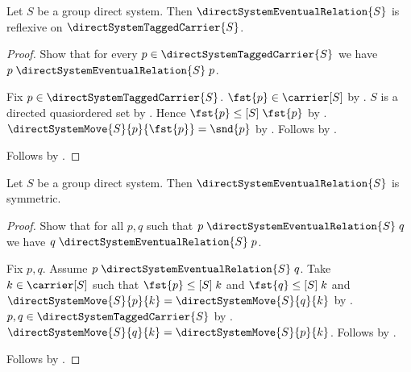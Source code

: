 \begin{proposition}\label{direct_system_eventual_reflexive}
    Let $S$ be a group direct system.
    Then $\directSystemEventualRelation{S}$ is reflexive on
        $\directSystemTaggedCarrier{S}$.
\end{proposition}
\begin{proof}
    Show that for every $p\in\directSystemTaggedCarrier{S}$ we have
        $p\mathrel{\directSystemEventualRelation{S}}p$.
    \begin{subproof}
        Fix $p\in\directSystemTaggedCarrier{S}$.
        $\fst{p}\in\carrier[S]$ by
            .
        $S$ is a directed quasiordered set by
            .
        Hence $\fst{p}\mathrel{\leq[S]}\fst{p}$ by
            .
        $\directSystemMove{S}{p}{\fst{p}}=\snd{p}$ by
            .
        Follows by
            .
    \end{subproof}
    Follows by .
\end{proof}

\begin{proposition}\label{direct_system_eventual_symmetric}
    Let $S$ be a group direct system.
    Then $\directSystemEventualRelation{S}$ is symmetric.
\end{proposition}
\begin{proof}
    Show that for all $p,q$ such that
        $p\mathrel{\directSystemEventualRelation{S}}q$ we have
        $q\mathrel{\directSystemEventualRelation{S}}p$.
    \begin{subproof}
        Fix $p,q$.
        Assume $p\mathrel{\directSystemEventualRelation{S}}q$.
        Take $k\in\carrier[S]$ such that
            $\fst{p}\mathrel{\leq[S]}k$ and
            $\fst{q}\mathrel{\leq[S]}k$ and
            $\directSystemMove{S}{p}{k}
                =\directSystemMove{S}{q}{k}$ by
            .
        $p,q\in\directSystemTaggedCarrier{S}$ by
            .
        $\directSystemMove{S}{q}{k}
            =\directSystemMove{S}{p}{k}$.
        Follows by
            .
    \end{subproof}
    Follows by .
\end{proof}


